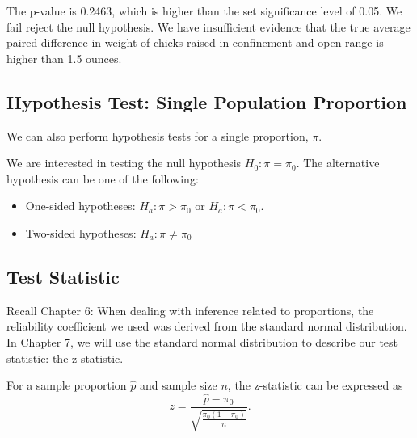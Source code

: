 \documentclass[
  letterpaper,
  DIV=11,
  numbers=noendperiod]{scrartcl}
\providecommand{\tightlist}{%
  \setlength{\itemsep}{0pt}\setlength{\parskip}{0pt}}
\begin{document}
The p-value is 0.2463, which is higher than the set significance level
of 0.05. We fail reject the null hypothesis. We have insufficient
evidence that the true average paired difference in weight of chicks
raised in confinement and open range is higher than 1.5 ounces.

\subsection{Hypothesis Test: Single Population
Proportion}\label{hypothesis-test-single-population-proportion}

We can also perform hypothesis tests for a single proportion, \(\pi\).

We are interested in testing the null hypothesis \(H_0: \pi=\pi_0\). The
alternative hypothesis can be one of the following:

\begin{itemize}
\tightlist
\item
  One-sided hypotheses: \(H_a: \pi>\pi_0\) or \(H_a: \pi<\pi_0\).
\item
  Two-sided hypotheses: \(H_a: \pi \neq \pi_0\)
\end{itemize}

\subsection{Test Statistic}\label{test-statistic-4}

\begin{tcolorbox}[enhanced jigsaw, bottomtitle=1mm, colback=white, opacityback=0, leftrule=.75mm, opacitybacktitle=0.6, coltitle=black, left=2mm, colframe=quarto-callout-note-color-frame, toptitle=1mm, colbacktitle=quarto-callout-note-color!10!white, titlerule=0mm, title=\textcolor{quarto-callout-note-color}{\faInfo}\hspace{0.5em}{Note}, arc=.35mm, rightrule=.15mm, breakable, bottomrule=.15mm, toprule=.15mm]

Recall Chapter 6: When dealing with inference related to proportions,
the reliability coefficient we used was derived from the standard normal
distribution. In Chapter 7, we will use the standard normal distribution
to describe our test statistic: the z-statistic.

\end{tcolorbox}

For a sample proportion \(\hat{p}\) and sample size \(n\), the
z-statistic can be expressed as \[
z = \frac{\hat{p}-\pi_0}{\sqrt{\frac{\pi_0(1-\pi_0)}{n}}}.
\]
\end{document}
